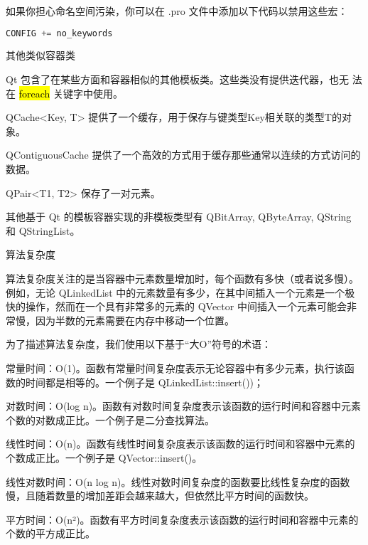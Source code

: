 如果你担心命名空间污染，你可以在 .pro 文件中添加以下代码以禁用这些宏：

\begin{lstlisting}[language=C++]
CONFIG += no_keywords
\end{lstlisting}

\splitLine

其他类似容器类

Qt 包含了在某些方面和容器相似的其他模板类。这些类没有提供迭代器，也无
法在 \hl{foreach} 关键字中使用。

\begin{compactitem}
\item QCache<Key, T> 提供了一个缓存，用于保存与键类型Key相关联的类型T的对象。
\item QContiguousCache 提供了一个高效的方式用于缓存那些通常以连续的方式访问的数据。
\item QPair<T1, T2> 保存了一对元素。
\end{compactitem}

其他基于 Qt 的模板容器实现的非模板类型有 QBitArray, QByteArray, QString 和 QStringList。

\splitLine

算法复杂度

算法复杂度关注的是当容器中元素数量增加时，每个函数有多快（或者说多慢）。例如，无论 QLinkedList 中的元素数量有多少，在其中间插入一个元素是一个极快的操作，然而在一个具有非常多的元素的 QVector 中间插入一个元素可能会非常慢，因为半数的元素需要在内存中移动一个位置。

为了描述算法复杂度，我们使用以下基于“大O”符号的术语：

\begin{compactitem}
\item 常量时间：O(1)。函数有常量时间复杂度表示无论容器中有多少元素，执行该函数的时间都是相等的。一个例子是 QLinkedList::insert())；
\item 对数时间：O(log n)。函数有对数时间复杂度表示该函数的运行时间和容器中元素个数的对数成正比。一个例子是二分查找算法。
\item 线性时间：O(n)。函数有线性时间复杂度表示该函数的运行时间和容器中元素的个数成正比。一个例子是 QVector::insert()。
\item 线性对数时间：O(n log n)。线性对数时间复杂度的函数要比线性复杂度的函数慢，且随着数量的增加差距会越来越大，但依然比平方时间的函数快。
\item 平方时间：O(n²)。函数有平方时间复杂度表示该函数的运行时间和容器中元素的个数的平方成正比。
\end{compactitem}

